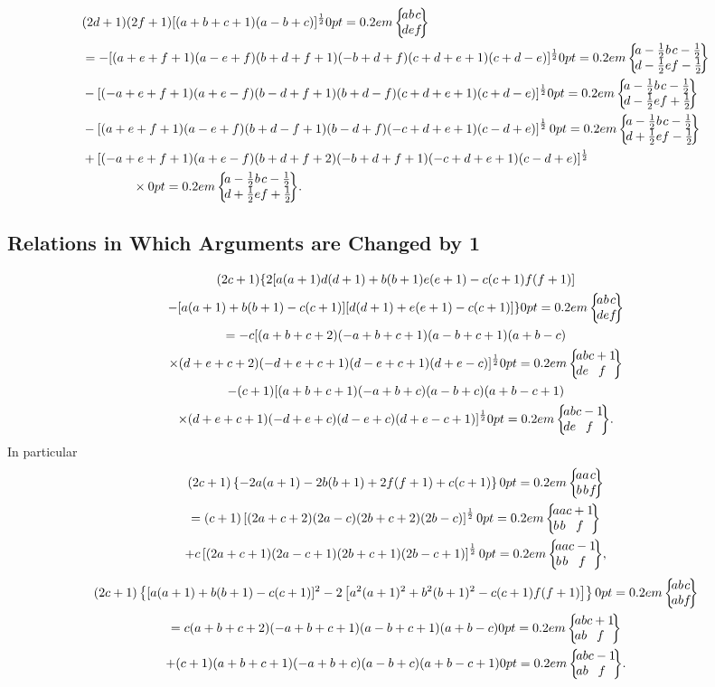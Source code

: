 \begin{align}
& (2 d+1)(2 f+1)[(a+b+c+1)(a-b+c)]^{\frac{1}{2}}\sixj{a}{b}{c}{d}{e}{f}  \notag\\
& =-[(a+e+f+1)(a-e+f)(b+d+f+1)(-b+d+f)(c+d+e+1)(c+d-e)]^{\frac{1}{2}}\sixj{a-\frac{1}{2}}{b}{c-\frac{1}{2}}{d-\frac{1}{2}}{e}{f-\frac{1}{2}}  \notag\\
& -[(-a+e+f+1)(a+e-f)(b-d+f+1)(b+d-f)(c+d+e+1)(c+d-e)]^{\frac{1}{2}}\sixj{a-\frac{1}{2}}{b}{c-\frac{1}{2}}{d-\frac{1}{2}}{e}{f+\frac{1}{2}}  \notag\\
& -\left[(a+e+f+1)(a-e+f)(b+d-f+1)(b-d+f)(-c+d+e+1)(c-d+e)\right]^{\frac{1}{2}}\sixj{a-\frac{1}{2}}{b}{c-\frac{1}{2}}{d+\frac{1}{2}}{e}{f-\frac{1}{2}}  \notag\\
& +[(-a+e+f+1)(a+e-f)(b+d+f+2)(-b+d+f+1)(-c+d+e+1)(c-d+e)]^{\frac{1}{2}}  \notag\\
& \qquad\qquad\times\sixj{a-\frac{1}{2}}{b}{c-\frac{1}{2}}{d+\frac{1}{2}}{e}{f+\frac{1}{2}} . \label{eq:9:6:4}
\end{align}
\subsection{Relations in Which Arguments are Changed by 1}\label{sec:9.6.2}
\begin{multline}
(2 c+1)\{2[a(a+1) d(d+1)+b(b+1) e(e+1)-c(c+1) f(f+1)]  \\
-[a(a+1)+b(b+1)-c(c+1)][d(d+1)+e(e+1)-c(c+1)]\}\sixj{a}{b}{c}{d}{e}{f}  \\
=-c[(a+b+c+2)(-a+b+c+1)(a-b+c+1)(a+b-c)  \\
\times(d+e+c+2)(-d+e+c+1)(d-e+c+1)(d+e-c)]^{\frac{1}{2}}\sixj{a}{b}{c+1}{d}{e}{f}  \\
-(c+1)[(a+b+c+1)(-a+b+c)(a-b+c)(a+b-c+1)  \\
\times(d+e+c+1)(-d+e+c)(d-e+c)(d+e-c+1)]^{\frac{1}{2}}\sixj{a}{b}{c-1}{d}{e}{f} .\label{eq:9:6:5}
\end{multline}
In particular
\begin{multline}
 (2 c+1)\left\{-2 a(a+1)-2 b(b+1)+2 f(f+1)+c(c+1)\right\}\sixj{a}{a}{c}{b}{b}{f} \\
 =(c+1)\left[(2 a+c+2)(2 a-c)(2 b+c+2)(2 b-c)\right]^{\frac{1}{2}}\sixj{a}{a}{c+1}{b}{b}{f}  \\
 +c\left[(2 a+c+1)(2 a-c+1)(2 b+c+1)(2 b-c+1)\right]^{\frac{1}{2}}\sixj{a}{a}{c-1}{b}{b}{f}, \label{eq:9:6:6}
\end{multline}
\begin{multline}
(2 c+1)\left\{[a(a+1)+b(b+1)-c(c+1)]^{2}-2\left[a^{2}(a+1)^{2}+b^{2}(b+1)^{2}-c(c+1) f(f+1)\right]\right\}\sixj{a}{b}{c}{a}{b}{f}  \\
=c(a+b+c+2)(-a+b+c+1)(a-b+c+1)(a+b-c)\sixj{a}{b}{c+1}{a}{b}{f}  \\
+(c+1)(a+b+c+1)(-a+b+c)(a-b+c)(a+b-c+1)\sixj{a}{b}{c-1}{a}{b}{f}. \label{eq:9:6:7}
\end{multline}
